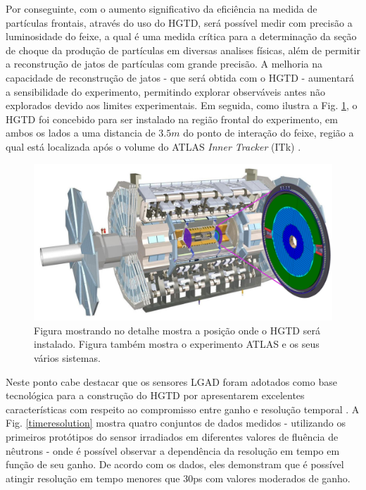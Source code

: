 Por conseguinte, com o aumento significativo da eficiência na medida de partículas frontais, através do uso do HGTD, será possível medir com precisão a luminosidade do feixe, a qual é uma medida crítica para a determinação da seção de choque da produção de partículas em diversas analises físicas, além de  permitir a reconstrução de jatos de partículas com grande precisão. A melhoria na capacidade de reconstrução de jatos - que será obtida com o HGTD - aumentará a sensibilidade do experimento, permitindo explorar observáveis antes não explorados devido aos limites experimentais.
Em seguida, como ilustra a Fig. \ref{hgtd}, o HGTD foi concebido para ser instalado na região frontal do experimento, em ambos os lados a uma distancia de $3.5m$ do ponto de interação do feixe, região a qual está localizada após o volume do ATLAS {\it Inner Tracker} (ITk) \cite{tdr}. 

\begin{figure} 
    \centering
    \includegraphics[width=15.0cm]{assets/ATLAS_HGTD.png}
    \caption{ Figura mostrando no detalhe mostra a posição onde o HGTD será instalado. Figura também mostra o experimento ATLAS e os seus vários sistemas.}
    \label{hgtd}
\end{figure}

Neste ponto cabe destacar que os sensores LGAD foram adotados como base tecnológica para a construção do HGTD por apresentarem excelentes características com respeito ao compromisso entre ganho e resolução temporal \cite{tdr,JIN_LGAD,NIMA_LGAD,NIMA_LGAD_I,NIMA_LGAD_II,NIMA_LGAD_III}. A Fig. \ref{timeresolution} mostra quatro conjuntos de dados medidos - utilizando os primeiros protótipos do sensor irradiados em  diferentes valores de fluência de nêutrons - onde é possível observar a dependência da resolução em tempo em função de seu ganho. De acordo com os dados, eles demonstram que é possível atingir resolução em tempo menores que 30ps com valores moderados de ganho.   

